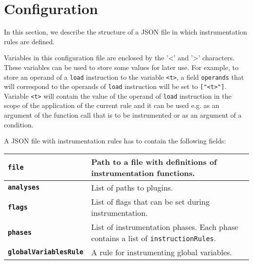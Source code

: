 \section{Configuration}\label{sec:config}

In this section, we describe the structure of a JSON file in which
instrumentation rules are defined.

Variables in this configuration file are enclosed by the '<' and '>'
characters. These variables can be used to store some values for later use. For
example, to store an operand of a \texttt{load} instruction to the variable
\texttt{<t>}, a field \texttt{operands} that will correspond to the operands of
\texttt{load} instruction will be set to \texttt{["<t>"]}.  Variable
\texttt{<t>} will contain the value of the operand of \texttt{load} instruction
in the scope of the application of the current rule and it can be used e.g. as
an argument of the function call that is to be instrumented or as an argument
of a condition.

A JSON file with instrumentation rules has to contain the following fields:

\begin{center}
\begin{tabular}[h]{>{\bfseries}p{4.2cm} | p{7.8cm}}
  \texttt{file}                & Path to a file with definitions of instrumentation functions. \\
  \hline
  \texttt{analyses}            & List of paths to plugins. \\
  \hline
  \texttt{flags}               & List of flags that can be set during instrumentation. \\
  \hline
  \texttt{phases}              & List of instrumentation phases. Each phase contains a
                                 list of \texttt{instructionRules}. \\
  \hline
  \texttt{globalVariablesRule} & A rule for instrumenting global
                                 variables.

\end{tabular}
\end{center}

